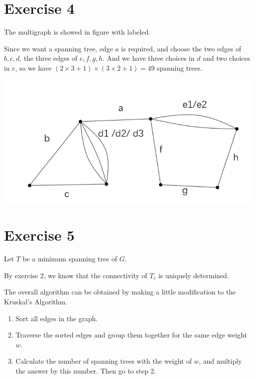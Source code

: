 \documentclass[
]{article}
\begin{document}
\hypertarget{exercise-4}{%
\section{Exercise 4}\label{exercise-4}}

The multigraph is showed in figure with labeled.

Since we want a spanning tree, edge \(a\) is required, and choose the
two edges of \(b,c,d\), the three edges of \(e,f,g,h\). And we have
three choices in \(d\) and two choices in \(e\), so we have
\((2\times 3+1)\times(3\times 2+1)=49\) spanning trees.

\includegraphics{3.ex.4.png}

\hypertarget{exercise-5}{%
\section{Exercise 5}\label{exercise-5}}

Let \(T\) be a minimum spanning tree of \(G\).

By exercise 2, we know that the connectivity of \(T_c\) is uniquely
determined.

The overall algorithm can be obtained by making a little modification to
the Kruskal's Algorithm.

\begin{enumerate}
\def\labelenumi{\arabic{enumi}.}
\item
  Sort all edges in the graph.
\item
  Traverse the sorted edges and group them together for the same edge
  weight \(w\).
\item
  Calculate the number of spanning trees with the weight of \(w\), and
  multiply the answer by this number. Then go to step 2.
\end{enumerate}
\end{document}
